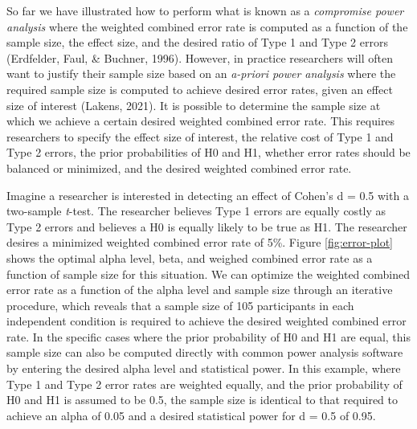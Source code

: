 \documentclass[
  english,
  ,man, a4paper,floatsintext]{apa6}
\begin{document}
So far we have illustrated how to perform what is known as a \emph{compromise power analysis} where the weighted combined error rate is computed as a function of the sample size, the effect size, and the desired ratio of Type 1 and Type 2 errors (Erdfelder, Faul, \& Buchner, 1996). However, in practice researchers will often want to justify their sample size based on an \emph{a-priori power analysis} where the required sample size is computed to achieve desired error rates, given an effect size of interest (Lakens, 2021). It is possible to determine the sample size at which we achieve a certain desired weighted combined error rate. This requires researchers to specify the effect size of interest, the relative cost of Type 1 and Type 2 errors, the prior probabilities of H0 and H1, whether error rates should be balanced or minimized, and the desired weighted combined error rate.

Imagine a researcher is interested in detecting an effect of Cohen's d = 0.5 with a two-sample \emph{t}-test. The researcher believes Type 1 errors are equally costly as Type 2 errors and believes a H0 is equally likely to be true as H1. The researcher desires a minimized weighted combined error rate of 5\%. Figure \ref{fig:error-plot} shows the optimal alpha level, beta, and weighed combined error rate as a function of sample size for this situation. We can optimize the weighted combined error rate as a function of the alpha level and sample size through an iterative procedure, which reveals that a sample size of 105 participants in each independent condition is required to achieve the desired weighted combined error rate. In the specific cases where the prior probability of H0 and H1 are equal, this sample size can also be computed directly with common power analysis software by entering the desired alpha level and statistical power. In this example, where Type 1 and Type 2 error rates are weighted equally, and the prior probability of H0 and H1 is assumed to be 0.5, the sample size is identical to that required to achieve an alpha of 0.05 and a desired statistical power for d = 0.5 of 0.95.
\end{document}
